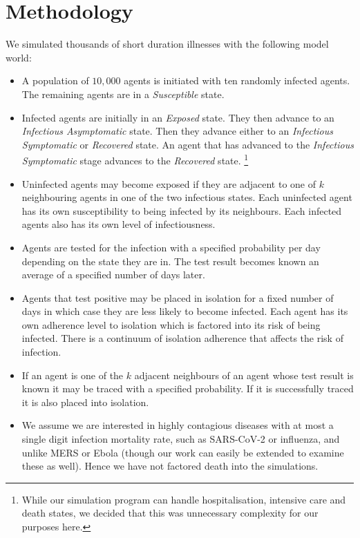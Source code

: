 \documentclass{article}
\begin{document}
\section{Methodology}

We simulated thousands of short duration illnesses with the following
model world:

\begin{itemize}

\item A population of $10,000$ agents is initiated with ten randomly infected
  agents. The remaining agents are in a \emph{Susceptible} state.

\item Infected agents are initially in an \emph{Exposed} state. They then
  advance to an \emph{Infectious Asymptomatic} state. Then they advance either
  to an \emph{Infectious Symptomatic} or \emph{Recovered} state. An agent that
  has advanced to the \emph{Infectious Symptomatic} stage advances to the
  \emph{Recovered} state. \footnote{While our simulation program can handle
  hospitalisation, intensive care and death states, we decided that this was
  unnecessary complexity for our purposes here.}

\item Uninfected agents may become exposed if they are adjacent to one of $k$
  neighbouring agents in one of the two infectious states. Each uninfected agent
  has its own susceptibility to being infected by its neighbours. Each infected
  agents also has its own level of infectiousness.

\item Agents are tested for the infection with a specified probability per day
depending on the state they are in. The test result becomes known an average
of a specified number of days later.


\item Agents that test positive may be placed in isolation for a fixed
number of days in which case they are less likely to become infected. Each agent
has its own adherence level to isolation which is factored into its risk of
being infected. There is a continuum of isolation adherence that affects the
risk of infection.

\item If an agent is one of the $k$ adjacent neighbours of an agent whose test
result is known it may be traced with a specified probability. If it is
successfully traced it is also placed into isolation.

\item We assume we are interested in highly contagious diseases with at most a
  single digit infection mortality rate, such as SARS-CoV-2 or influenza, and
  unlike MERS or Ebola (though our work can easily be extended to examine these
  as well). Hence we have not factored death into the simulations.

\end{itemize}
\end{document}
